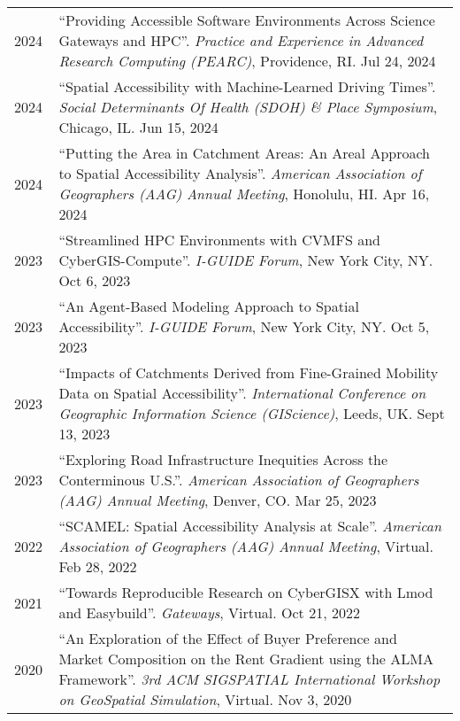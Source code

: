 \documentclass{acmcv}
\begin{document}
    \begin{longtable}{p{0.1\linewidth} p{0.9\linewidth}}
        2024 & ``Providing Accessible Software Environments Across Science Gateways and HPC''. \textit{Practice and Experience in Advanced Research Computing (PEARC)}, Providence, RI. Jul 24, 2024\\

        2024 & ``Spatial Accessibility with Machine-Learned Driving Times''. \textit{Social Determinants Of Health (SDOH) \& Place Symposium}, Chicago, IL. Jun 15, 2024\\

        2024 & ``Putting the Area in Catchment Areas: An Areal Approach to Spatial Accessibility Analysis''. \textit{American Association of Geographers (AAG) Annual Meeting}, Honolulu, HI. Apr 16, 2024\\

        2023 & ``Streamlined HPC Environments with CVMFS and CyberGIS-Compute''. \textit{I-GUIDE Forum}, New York City, NY. Oct 6, 2023\\

        2023 & ``An Agent-Based Modeling Approach to Spatial Accessibility''. \textit{I-GUIDE Forum}, New York City, NY. Oct 5, 2023\\

        2023 & ``Impacts of Catchments Derived from Fine-Grained Mobility Data on Spatial Accessibility''. \textit{International Conference on Geographic Information Science (GIScience)}, Leeds, UK. Sept 13, 2023\\

        2023 & ``Exploring Road Infrastructure Inequities Across the Conterminous U.S.''. \textit{American Association of Geographers (AAG) Annual Meeting}, Denver, CO. Mar 25, 2023\\

        2022 & ``SCAMEL: Spatial Accessibility Analysis at Scale''. \textit{American Association of Geographers (AAG) Annual Meeting}, Virtual. Feb 28, 2022\\

        2021 & ``Towards Reproducible Research on CyberGISX with Lmod and Easybuild''. \textit{Gateways}, Virtual. Oct 21, 2022\\

        2020 & ``An Exploration of the Effect of Buyer Preference and Market Composition on the Rent Gradient using the ALMA Framework''. \textit{3rd ACM SIGSPATIAL International Workshop on GeoSpatial Simulation}, Virtual. Nov 3, 2020 \\


\end{longtable}
\end{document}
